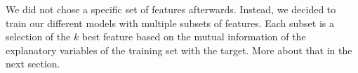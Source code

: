 We did not chose a specific set of features afterwards. Instead, we decided to train our different models with multiple subsets of features. Each subset is a selection of the $k$ best feature based on the mutual information of the explanatory variables of the training set with the target. More about that in the next section.

